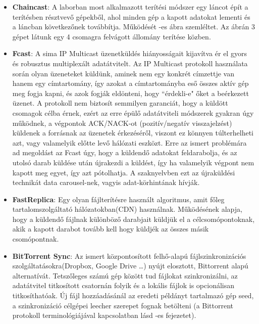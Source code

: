 \begin{itemize}
  \item \textbf{Chaincast}: A laborban most alkalmazott terítési módszer egy láncot épít a terítésben résztvevő gépekből, ahol minden gép a kapott adatokat lementi és a láncban következőnek továbbítja. Működését -es ábra szemléltet. Az ábrán 3 gépet látunk egy 4 csomagra felvágott állomány terítése közben.
  \item \textbf{Fcast}\cite{gemmell2000fcast}: A sima IP Multicast üzenetküldés hiányosságait kijavítva ér el gyors és robusztus multiplexált adatátvitelt. Az IP Multicast protokoll használata során olyan üzeneteket küldünk, aminek nem egy konkrét címzettje van hanem egy címtartomány, így azokat a címtartományba eső összes aktív gép meg fogja kapni, és azok fogják eldönteni, hogy ``érdekli-e" őket a beérkezett üzenet. A protokoll nem biztosít semmilyen garanciát, hogy a küldött csomagok célba érnek, ezért az erre épülő adatátviteli módszerek gyakran úgy működnek, a végpontok ACK/NACK-ot (pozitív/negatív visszajelzést) küldenek a forrásnak az üzenetek érkezéséről, viszont ez könnyen túlterhelheti azt, vagy valamelyik előtte levő hálózati eszközt. Erre az ismert problémára ad megoldást az Fcast úgy, hogy a küldendő adatokat feldarabolja, és az utolsó darab küldése után újrakezdi a küldést, így ha valamelyik végpont nem kapott meg egyet, így azt pótolhatja. A szaknyelvben ezt az újraküldési technikát data carousel-nek, vagyis adat-körhintának hívják.
  \item \textbf{FastReplica}\cite{cherkasova2003fastreplica}:  Egy olyan fájlterítésre használt algoritmus, amit főleg tartalomszolgáltató hálózatokban(CDN) használnak. Működésének alapja, hogy a küldendő fájlnak különböző darabjait küldjük el a célcsomópontoknak, akik a kapott darabot tovább kell hogy küldjék az összes másik csomópontnak.
  \item \textbf{BitTorrent Sync}\cite{farina2014bittorrent}: Az ismert központosított felhő-alapú fájlszinkronizációs szolgáltatásokra(Dropbox, Google Drive \ldots) nyújt elosztott, Bittorrent alapú alternatívát. Tetszőleges számú gép között tud fájlokat szinkronizálni, az adatátvitel titkosított csatornán folyik és a lokális fájlok is opcionálisan titkosíthatóak. Új fájl hozzáadásánál az eredeti példányt tartalmazó gép seed, a szinkronizáció célgépei leecher szerepet fognak betölteni (a Bittorrent protokoll terminológiájával kapcsolatban lásd -es fejezetet).
\end{itemize}

